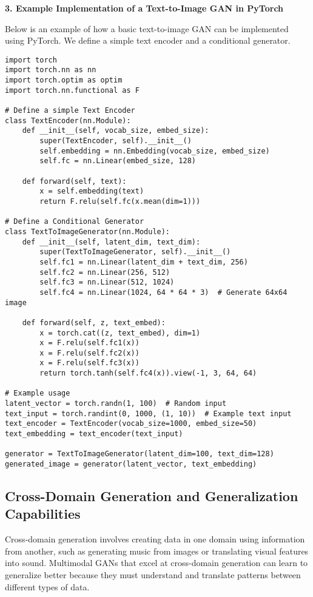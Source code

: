\textbf{3. Example Implementation of a Text-to-Image GAN in PyTorch}

Below is an example of how a basic text-to-image GAN can be implemented using PyTorch. We define a simple text encoder and a conditional generator.

\begin{lstlisting}[style=python]
import torch
import torch.nn as nn
import torch.optim as optim
import torch.nn.functional as F

# Define a simple Text Encoder
class TextEncoder(nn.Module):
    def __init__(self, vocab_size, embed_size):
        super(TextEncoder, self).__init__()
        self.embedding = nn.Embedding(vocab_size, embed_size)
        self.fc = nn.Linear(embed_size, 128)
    
    def forward(self, text):
        x = self.embedding(text)
        return F.relu(self.fc(x.mean(dim=1)))

# Define a Conditional Generator
class TextToImageGenerator(nn.Module):
    def __init__(self, latent_dim, text_dim):
        super(TextToImageGenerator, self).__init__()
        self.fc1 = nn.Linear(latent_dim + text_dim, 256)
        self.fc2 = nn.Linear(256, 512)
        self.fc3 = nn.Linear(512, 1024)
        self.fc4 = nn.Linear(1024, 64 * 64 * 3)  # Generate 64x64 image
    
    def forward(self, z, text_embed):
        x = torch.cat((z, text_embed), dim=1)
        x = F.relu(self.fc1(x))
        x = F.relu(self.fc2(x))
        x = F.relu(self.fc3(x))
        return torch.tanh(self.fc4(x)).view(-1, 3, 64, 64)

# Example usage
latent_vector = torch.randn(1, 100)  # Random input
text_input = torch.randint(0, 1000, (1, 10))  # Example text input
text_encoder = TextEncoder(vocab_size=1000, embed_size=50)
text_embedding = text_encoder(text_input)

generator = TextToImageGenerator(latent_dim=100, text_dim=128)
generated_image = generator(latent_vector, text_embedding)
\end{lstlisting}

\subsection{Cross-Domain Generation and Generalization Capabilities}

Cross-domain generation involves creating data in one domain using information from another, such as generating music from images or translating visual features into sound. Multimodal GANs that excel at cross-domain generation can learn to generalize better because they must understand and translate patterns between different types of data.

